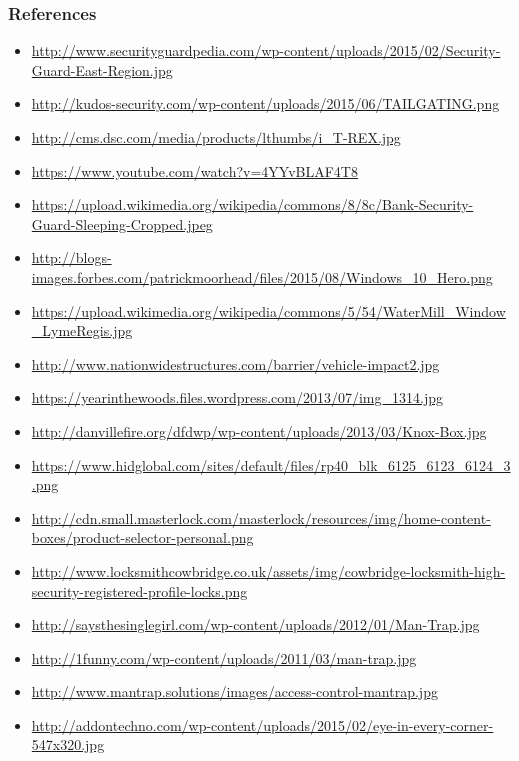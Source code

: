 \documentclass[]{beamer}
\begin{document}
\begin{frame}
  \frametitle{References}
  \begin{itemize}
    \item \url{http://www.securityguardpedia.com/wp-content/uploads/2015/02/Security-Guard-East-Region.jpg}
    \item \url{http://kudos-security.com/wp-content/uploads/2015/06/TAILGATING.png}
    \item \url{http://cms.dsc.com/media/products/lthumbs/i_T-REX.jpg}
    \item \url{https://www.youtube.com/watch?v=4YYvBLAF4T8}
    \item \url{https://upload.wikimedia.org/wikipedia/commons/8/8c/Bank-Security-Guard-Sleeping-Cropped.jpeg}
    \item \url{http://blogs-images.forbes.com/patrickmoorhead/files/2015/08/Windows_10_Hero.png}
    \item \url{https://upload.wikimedia.org/wikipedia/commons/5/54/WaterMill_Window_LymeRegis.jpg}
    \item \url{http://www.nationwidestructures.com/barrier/vehicle-impact2.jpg}
    \item \url{https://yearinthewoods.files.wordpress.com/2013/07/img_1314.jpg}
    \item \url{http://danvillefire.org/dfdwp/wp-content/uploads/2013/03/Knox-Box.jpg}
    \item \url{https://www.hidglobal.com/sites/default/files/rp40_blk_6125_6123_6124_3.png}
    \item \url{http://cdn.small.masterlock.com/masterlock/resources/img/home-content-boxes/product-selector-personal.png}
    \item \url{http://www.locksmithcowbridge.co.uk/assets/img/cowbridge-locksmith-high-security-registered-profile-locks.png}
    \item \url{http://saysthesinglegirl.com/wp-content/uploads/2012/01/Man-Trap.jpg}
    \item \url{http://1funny.com/wp-content/uploads/2011/03/man-trap.jpg}
    \item \url{http://www.mantrap.solutions/images/access-control-mantrap.jpg}
    \item \url{http://addontechno.com/wp-content/uploads/2015/02/eye-in-every-corner-547x320.jpg}
  \end{itemize}

\end{frame}
\end{document}
